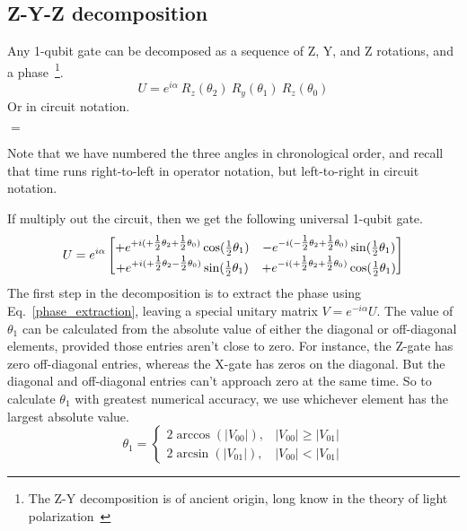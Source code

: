 \subsection{Z-Y-Z decomposition}
\label{sec:ZYZdeke}
Any 1-qubit gate can be decomposed as a sequence of Z, Y, and Z rotations, and a phase~\cite{Barenco1995b}\footnote{The Z-Y decomposition is of ancient origin, long know in the theory of light polarization~\cite{Sousa2006a}}.
\[
U =  e^{i\alpha}\ R_z(\theta_2)\ R_y(\theta_1)\ R_z(\theta_0)
\]
Or in circuit notation.
\begin{center}
$=$

\end{center}
Note that we have numbered the three angles in chronological order, and recall that time runs right-to-left in operator notation, but left-to-right in circuit notation. 

If multiply out the circuit, then we get the following universal 1-qubit gate.
\[
U = 
e^{i\alpha} \begin{bmatrix}
+e^{+i(+\tfrac{1}{2}\theta_2 + \tfrac{1}{2}\theta_0)} \cos(\tfrac{1}{2}\theta_1) 
& -e^{-i(-\tfrac{1}{2}\theta_2 + \tfrac{1}{2}\theta_0)} \sin(\tfrac{1}{2}\theta_1) 
\\
+e^{+i(+\tfrac{1}{2}\theta_2 - \tfrac{1}{2}\theta_0)} \sin(\tfrac{1}{2}\theta_1) 
& +e^{-i(+\tfrac{1}{2}\theta_2 +\tfrac{1}{2}\theta_0)} \cos(\tfrac{1}{2}\theta_1)
\end{bmatrix}
\]
The first step in the decomposition is to extract the phase using Eq.~\eqref{phase_extraction}, leaving a special unitary matrix $V = e^{-i\alpha} U$.
%
The value of $\theta_1$ can be calculated from the absolute value of either the diagonal or off-diagonal elements, provided those entries aren't close to zero.
For instance, the Z-gate has zero off-diagonal entries, whereas the X-gate has zeros on the diagonal. But the diagonal and off-diagonal entries can't approach zero at the same time.  So to calculate $\theta_1$ with greatest numerical accuracy, we use whichever element has the largest absolute value.
\[
\theta_1 = 
  \begin{cases}
		2 \arccos(|V_{00}|), & |V_{00}| \geq |V_{01}|\\	
		2 \arcsin(|V_{01}|), & |V_{00}| < |V_{01}|		
	\end{cases} 
\]


